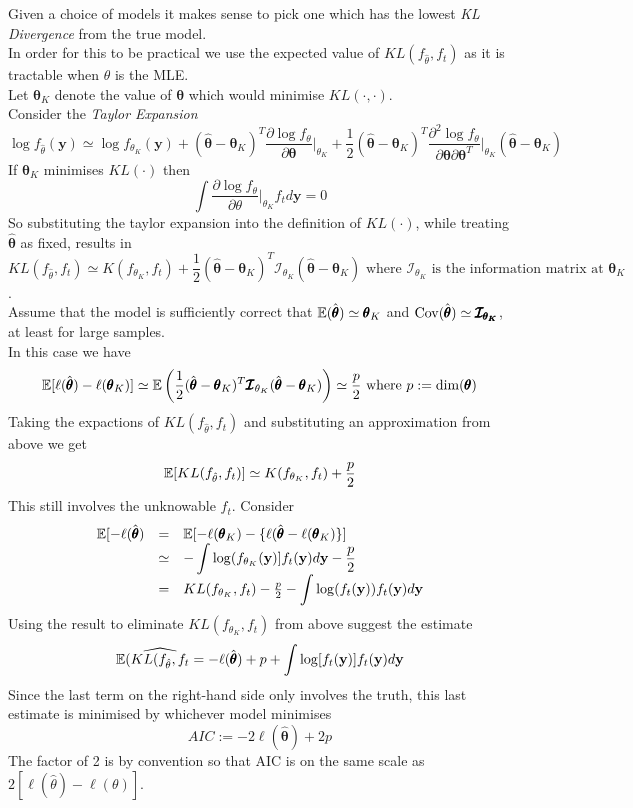 \documentclass[11pt,a4paper]{article}
\begin{document}
Given a choice of models it makes sense to pick one which has the lowest \textit{KL Divergence} from the true model.\\
In order for this to be practical we use the expected value of $KL(f_{\hat\theta},f_t)$ as it is tractable when $\hat\theta$ is the MLE.\\
Let $\pmb\theta_K$ denote the value of $\pmb\theta$ which would minimise $KL(\cdot,\cdot)$.\\
Consider the \textit{Taylor Expansion}
$$\log f_{\hat\theta}(\textbf{y})\simeq\log f_{\theta_K}(\textbf{y})+(\hat{\pmb\theta}-\pmb\theta_K)^T\dfrac{\partial\log f_\theta}{\partial\pmb\theta}\bigg|_{\theta_K}+\frac12(\hat{\pmb\theta}-\pmb\theta_K)^T\dfrac{\partial^2\log f_\theta}{\partial\pmb\theta\partial\pmb{\theta}^T}\bigg|_{\theta_K}(\hat{\pmb\theta}-\pmb\theta_K)$$
If $\pmb\theta_K$ minimises $KL(\cdot)$ then
$$\int\frac{\partial\log f_\theta}{\partial\theta}\bigg|_{\theta_K}f_td\textbf{y}=0$$
So substituting the taylor expansion into the definition of $KL(\cdot)$, while treating $\hat{\pmb\theta}$ as fixed, results in
$$KL(f_{\hat\theta},f_t)\simeq K(f_{\theta_K},f_t)+\frac12(\hat{\pmb\theta}-\pmb\theta_K)^T\pmb{\mathcal{I}}_{\theta_K}(\hat{\pmb\theta}-\pmb\theta_K)\text{ where }\pmb{\mathcal{I}}_{\theta_K}\text{ is the information matrix at }\pmb\theta_K$$.\\
Assume that the model is sufficiently correct that $\mathbb{E}(\hat{\pmb\theta})\simeq\pmb\theta_K$ and $\mathrm{Cov}(\hat{\pmb\theta})\simeq\pmb{\mathcal{I}_{\theta_K}}$, at least for large samples.\\
In this case we have
$$\mathbb{E}[\ell(\hat{\pmb\theta})-\ell(\pmb\theta_K)]\simeq\mathbb{E}\left(\frac12(\hat{\pmb\theta}-\pmb\theta_K)^T\pmb{\mathcal{I}}_{\theta_K}(\hat{\pmb\theta}-\pmb\theta_K)\right)\simeq\frac{p}2\text{ where }p:=\text{dim}(\pmb\theta)$$
Taking the expactions of $KL(f_{\hat\theta},f_t)$ and substituting an approximation from above we get
$$\mathbb{E}[KL(f_{\hat\theta},f_t)]\simeq K(f_{\theta_K},f_t)+\frac{p}2$$
This still involves the unknowable $f_t$. Consider
\[\begin{array}{rcl}
\mathbb{E}[-\ell(\hat{\pmb\theta})&=&\mathbb{E}[-\ell(\pmb\theta_K)-\{\ell(\hat{\pmb\theta}-\ell(\pmb\theta_K)\}]\\
&\simeq&-\displaystyle\int\log(f_{\theta_K}(\textbf{y})]f_t(\textbf{y})d\textbf{y}-\frac{p}2\\
&=&KL(f_{\theta_K},f_t)-\frac{p}2-\displaystyle\int\log(f_t(\textbf{y}))f_t(\textbf{y})d\textbf{y}
\end{array}\]
Using the result to eliminate $KL(f_{\theta_K},f_t)$ from above suggest the estimate
$$\mathbb{E}(\widehat{KL(f_{\hat\theta},f_t}=-\ell(\hat{\pmb\theta})+p+\displaystyle\int\log[f_t(\textbf{y})]f_t(\textbf{y})d\textbf{y}$$
Since the last term on the right-hand side only involves the truth, this last estimate is minimised by whichever model minimises
$$AIC:=-2\ell(\hat{\pmb\theta})+2p$$
\nb The factor of 2 is by convention so that AIC is on the same scale as $2[\ell(\hat\theta)-\ell(\theta)]$.\\
\end{document}
